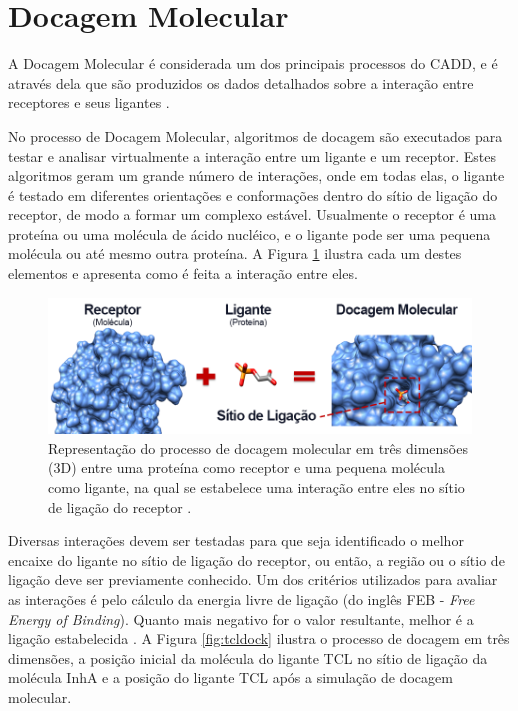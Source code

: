 \section{Docagem Molecular}

A Docagem Molecular é considerada um dos principais processos do CADD, e é através dela que são produzidos os dados detalhados sobre a interação entre receptores e seus ligantes \cite{LEN96}. 

No processo de Docagem Molecular, algoritmos de docagem são executados para testar e analisar virtualmente a interação entre um ligante e um receptor. Estes algoritmos geram um grande número de interações, onde em todas elas, o ligante é testado em diferentes orientações e conformações dentro do sítio de ligação do receptor, de modo a formar um complexo estável. 
Usualmente o receptor é uma proteína ou uma molécula de ácido nucléico, e o ligante pode ser uma pequena molécula ou até mesmo outra proteína. A Figura \ref{fig:docking} \cite{ALE13} ilustra cada um destes elementos e apresenta como é feita a interação entre eles.

\begin{figure}[h]
	\center
	\includegraphics[width=17cm]{images/docking.png}
	\caption{Representação do processo de docagem molecular em três dimensões (3D) entre uma proteína como receptor e uma pequena molécula como ligante, na qual se estabelece uma interação entre eles no sítio de ligação do receptor \cite{ALE13}.}
	\label{fig:docking}
\end{figure}

Diversas interações devem ser testadas para que seja identificado o melhor encaixe do ligante no sítio de ligação do receptor, ou então, a região ou o sítio de ligação deve ser previamente conhecido. Um dos critérios utilizados para avaliar as interações é pelo cálculo da energia livre de ligação (do inglês FEB - \emph{Free Energy of Binding}). Quanto mais negativo for o valor resultante, melhor é a ligação estabelecida \cite{kar07}. A Figura \ref{fig:tcldock} \cite{REN13} ilustra o processo de docagem em três dimensões, a posição inicial da molécula do ligante TCL no sítio de ligação da molécula InhA e a posição do ligante TCL após a simulação de docagem molecular.

